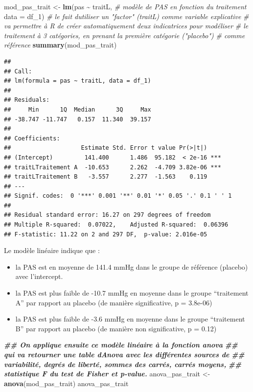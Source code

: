 \documentclass[
]{book}
\newenvironment{Shaded}{\begin{snugshade}}{\end{snugshade}}
\newcommand{\AttributeTok}[1]{\textcolor[rgb]{0.13,0.29,0.53}{#1}}
\newcommand{\CommentTok}[1]{\textcolor[rgb]{0.56,0.35,0.01}{\textit{#1}}}
\newcommand{\DocumentationTok}[1]{\textcolor[rgb]{0.56,0.35,0.01}{\textbf{\textit{#1}}}}
\newcommand{\FunctionTok}[1]{\textcolor[rgb]{0.13,0.29,0.53}{\textbf{#1}}}
\newcommand{\NormalTok}[1]{#1}
\newcommand{\OtherTok}[1]{\textcolor[rgb]{0.56,0.35,0.01}{#1}}
\newcommand{\SpecialCharTok}[1]{\textcolor[rgb]{0.81,0.36,0.00}{\textbf{#1}}}
\providecommand{\tightlist}{%
  \setlength{\itemsep}{0pt}\setlength{\parskip}{0pt}}
\begin{document}
\begin{Shaded}
\begin{Highlighting}[]
\NormalTok{mod\_pas\_trait }\OtherTok{\textless{}{-}} \FunctionTok{lm}\NormalTok{(pas }\SpecialCharTok{\textasciitilde{}}\NormalTok{ traitL, }\CommentTok{\# modèle de PAS en fonction du traitement}
                    \AttributeTok{data =}\NormalTok{ df\_1)}
\CommentTok{\# le fait d\textquotesingle{}utiliser un "factor" (traitL) comme variable explicative}
\CommentTok{\# va permettre à R de créer automatiquement deux indicatrices pour modéliser}
\CommentTok{\# le traitement à 3 catégories, en prenant la première catégorie ("placebo")}
\CommentTok{\# comme référence}
\FunctionTok{summary}\NormalTok{(mod\_pas\_trait)}
\end{Highlighting}
\end{Shaded}

\begin{verbatim}
## 
## Call:
## lm(formula = pas ~ traitL, data = df_1)
## 
## Residuals:
##     Min      1Q  Median      3Q     Max 
## -38.747 -11.747   0.157  11.340  39.157 
## 
## Coefficients:
##                    Estimate Std. Error t value Pr(>|t|)    
## (Intercept)         141.400      1.486  95.182  < 2e-16 ***
## traitLTraitement A  -10.653      2.262  -4.709 3.82e-06 ***
## traitLTraitement B   -3.557      2.277  -1.563    0.119    
## ---
## Signif. codes:  0 '***' 0.001 '**' 0.01 '*' 0.05 '.' 0.1 ' ' 1
## 
## Residual standard error: 16.27 on 297 degrees of freedom
## Multiple R-squared:  0.07022,    Adjusted R-squared:  0.06396 
## F-statistic: 11.22 on 2 and 297 DF,  p-value: 2.016e-05
\end{verbatim}

Le modèle linéaire indique que :

\begin{itemize}
\tightlist
\item
  la PAS est en moyenne de 141.4 mmHg dans le groupe de référence (placebo) avec l'intercept.
\item
  la PAS est plus faible de -10.7 mmHg en moyenne dans le groupe ``traitement A'' par rapport au placebo (de manière significative, p = 3.8e-06)
\item
  la PAS est plus faible de -3.6 mmHg en moyenne dans le groupe ``traitement B'' par rapport au placebo (de manière non significative, p = 0.12)
\end{itemize}

\begin{Shaded}
\begin{Highlighting}[]
\DocumentationTok{\#\# On applique ensuite ce modèle linéaire à la fonction anova}
\DocumentationTok{\#\# qui va retourner une table d\textquotesingle{}Anova avec les différentes sources de }
\DocumentationTok{\#\# variabilité, degrés de liberté, sommes des carrés, carrés moyens, }
\DocumentationTok{\#\# statistique F du test de Fisher et p{-}value.}
\NormalTok{anova\_pas\_trait }\OtherTok{\textless{}{-}} \FunctionTok{anova}\NormalTok{(mod\_pas\_trait) }
\NormalTok{anova\_pas\_trait}
\end{Highlighting}
\end{Shaded}
\end{document}
